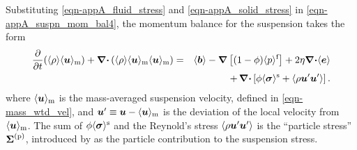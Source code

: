 \documentclass[aip,pof,preprint]{report}
\newcommand{\te}[1]{\mbox{\boldmath $#1$}}
\newcommand{\bea}{\begin{eqnarray}}
\newcommand{\eea}{\end{eqnarray}}
\newcommand{\Div}{\te{\nabla \cdot}}
\newcommand{\Grad}{\te{\nabla}}
\newcommand{\pder}[2]{\frac{\displaystyle\partial#1}{\displaystyle\partial#2}}
\newcommand{\avg}[1]{\langle #1 \rangle}
\newcommand{\subtext}[1]{\mbox{\scriptsize #1}}
\newcommand{\Sigmap}{\te{\Sigma}^{(\subtext{p})}}
\newcommand{\sigmas}{\avg{\te{\sigma}}^{\subtext{s}}}
\begin{document}
	Substituting \eqref{eqn-appA_fluid_stress} and \eqref{eqn-appA_solid_stress} in \eqref{eqn-appA_suspn_mom_bal4}, the momentum balance for the suspension takes the form
\bea
	\pder{}{t} (\avg{\rho} \avg{\te{u}}_{\subtext{m}}) + \Div \left( \avg{\rho} \avg{\te{u}}_{\subtext{m}} \avg{\te{u}}_{\subtext{m}} \right) & = &   \avg{\te{b}} - \Grad \left[(1-\phi) \avg{p}^{\subtext{f}} \right] + 2 \eta \Div \avg{\te{e}} \nonumber \\
	& & + \, \Div \left[ \phi \sigmas + \avg{\rho \te{u}' \te{u}'} \right].
\label{eqn-appA_suspn_mom_bal}
\eea
where $\avg{\te{u}}_{\subtext{m}}$ is the mass-averaged suspension velocity, defined in \eqref{eqn-mass_wtd_vel}, and $\te{u}' \equiv \te{u} - \avg{\te{u}}_{\subtext{m}}$ is the deviation of the local velocity from $\avg{\te{u}}_{\subtext{m}}$.  The sum of $\phi \sigmas$ and the Reynold's stress $\avg{\rho \te{u}' \te{u}'}$ is the ``particle stress'' $\Sigmap$, introduced by \citet{batchelor70} as the particle contribution to the suspension stress.
\end{document}
